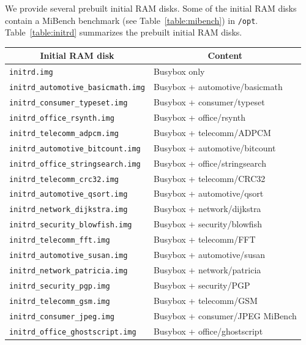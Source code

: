 We provide several prebuilt initial RAM disks.
Some of the initial RAM disks contain a MiBench benchmark (see Table~\ref{table:mibench}) in \texttt{/opt}.
Table~\ref{table:initrd} summarizes the prebuilt initial RAM disks.
\begin{table}[!h]
	\begin{center}
		\begin{tabular}{|l|l|}
		\hline
		\multicolumn{1}{|c|}{\textbf{Initial RAM disk}} & \multicolumn{1}{|c|}{\textbf{Content}}\\
		\hline
		\texttt{initrd.img} & Busybox only\\
		\hline
		\texttt{initrd\_automotive\_basicmath.img} & Busybox + automotive/basicmath\\
		\hline
		\texttt{initrd\_consumer\_typeset.img} & Busybox + consumer/typeset\\
		\hline
		\texttt{initrd\_office\_rsynth.img} & Busybox + office/rsynth\\
		\hline
		\texttt{initrd\_telecomm\_adpcm.img} & Busybox + telecomm/ADPCM\\
		\hline
		\texttt{initrd\_automotive\_bitcount.img} & Busybox + automotive/bitcount\\
		\hline
		\texttt{initrd\_office\_stringsearch.img} & Busybox + office/stringsearch\\
		\hline
		\texttt{initrd\_telecomm\_crc32.img} & Busybox + telecomm/CRC32\\
		\hline
		\texttt{initrd\_automotive\_qsort.img} & Busybox + automotive/qsort\\
		\hline
		\texttt{initrd\_network\_dijkstra.img} & Busybox + network/dijkstra\\
		\hline
		\texttt{initrd\_security\_blowfish.img} & Busybox + security/blowfish\\
		\hline
		\texttt{initrd\_telecomm\_fft.img} & Busybox + telecomm/FFT\\
		\hline
		\texttt{initrd\_automotive\_susan.img} & Busybox + automotive/susan\\
		\hline
		\texttt{initrd\_network\_patricia.img} & Busybox + network/patricia\\
		\hline
		\texttt{initrd\_security\_pgp.img} & Busybox + security/PGP\\
		\hline
		\texttt{initrd\_telecomm\_gsm.img} & Busybox + telecomm/GSM\\
		\hline
		\texttt{initrd\_consumer\_jpeg.img} & Busybox + consumer/JPEG MiBench\\
		\hline
		\texttt{initrd\_office\_ghostscript.img} & Busybox + office/ghostscript\\

\end{tabular}
\end{center}
\end{table}
